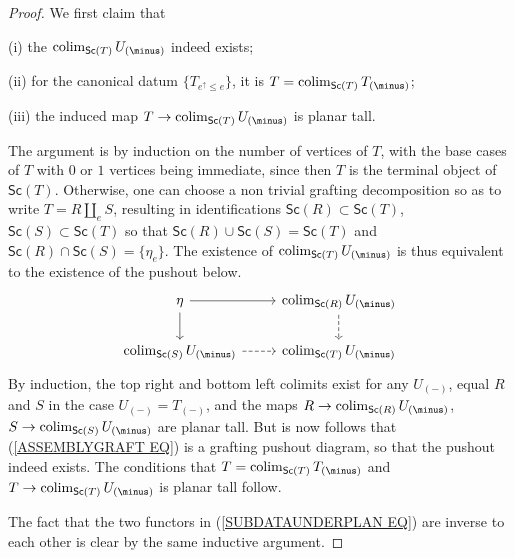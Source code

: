 \documentclass[a4paper,10pt]{article}%
\begin{document}
\begin{proof}
We first claim that
\begin{inparaenum}
\item[(i)] the $\colim_{\mathsf{Sc}(T)} U_{(\minus)}$ indeed exists;
\item[(ii)] for the canonical datum $\{T_{e^{\uparrow}\leq e}\}$, it is $T = \colim_{\mathsf{Sc}(T)} T_{(\minus)}$;
\item[(iii)] the induced map
$T \to \colim_{\mathsf{Sc}(T)} U_{(\minus)}$ is planar tall.
\end{inparaenum}
 
The argument is by induction on the number of vertices of $T$, with the base cases of $T$ with $0$ or $1$ vertices being immediate, since then $T$ is the terminal object of $\mathsf{Sc}(T)$.
Otherwise, one can choose a non trivial grafting decomposition so as to write $T = R \amalg_e S$, resulting 
in identifications 
$\mathsf{Sc}(R) \subset \mathsf{Sc}(T)$, 
$\mathsf{Sc}(S) \subset \mathsf{Sc}(T)$
so that 
$\mathsf{Sc}(R) \cup \mathsf{Sc}(S) = \mathsf{Sc}(T)$
and 
$\mathsf{Sc}(R) \cap \mathsf{Sc}(S) = \{\eta_e \}$.
The existence of $\colim_{\mathsf{Sc}(T)}U_{(\minus)}$
is thus equivalent to the existence of the pushout below.
\begin{equation}\label{ASSEMBLYGRAFT EQ}
\begin{tikzcd}
	\eta \ar{r} \ar{d} & \colim_{\mathsf{Sc}(R)}U_{(\minus)} \ar[dashed,d]
\\
	\colim_{\mathsf{Sc}(S)}U_{(\minus)} \ar[dashed,r] &
	\colim_{\mathsf{Sc}(T)}U_{(\minus)}
\end{tikzcd}
\end{equation}
By induction, the top right and bottom left colimits exist for any $U_{(\minus)}$, 
equal $R$ and $S$ in the case $U_{(\minus)} = T_{(\minus)}$,
and the maps 
$R \to \colim_{\mathsf{Sc}(R)}U_{(\minus)}$,
$S \to \colim_{\mathsf{Sc}(S)}U_{(\minus)}$
are planar tall.
But is now follows that (\ref{ASSEMBLYGRAFT EQ}) is a grafting pushout diagram, so that the pushout indeed exists. The conditions that
$T = \colim_{\mathsf{Sc}(T)}T_{(\minus)}$
and 
$T \to \colim_{\mathsf{Sc}(T)}U_{(\minus)}$
is planar tall follow.

The fact that the two functors in (\ref{SUBDATAUNDERPLAN EQ})
are inverse to each other is clear by the same inductive argument.
\end{proof}
\end{document}
